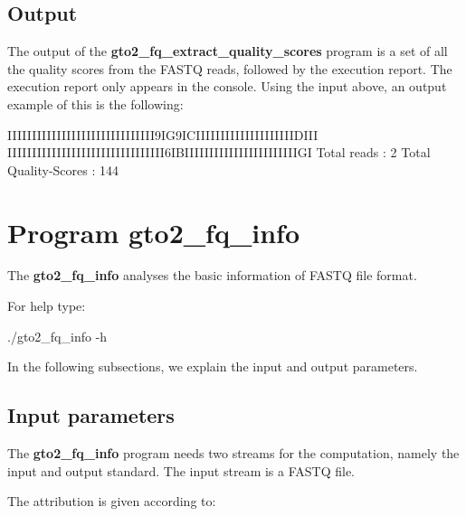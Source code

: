\documentclass[11pt,]{krantz}
\newenvironment{Shaded}{\begin{snugshade}}{\end{snugshade}}
\newcommand{\ExtensionTok}[1]{#1}
\newcommand{\NormalTok}[1]{#1}
\begin{document}
\subsection*{Output}\label{output-3}


The output of the \textbf{gto2\_fq\_extract\_quality\_scores} program is
a set of all the quality scores from the FASTQ reads, followed by the
execution report. The execution report only appears in the console.
Using the input above, an output example of this is the following:

\begin{Shaded}
\begin{Highlighting}[]
\ExtensionTok{IIIIIIIIIIIIIIIIIIIIIIIIIIIIII9IG9ICIIIIIIIIIIIIIIIIIIIIDIII}
\ExtensionTok{IIIIIIIIIIIIIIIIIIIIIIIIIIIIIIII6IBIIIIIIIIIIIIIIIIIIIIIIIGI}
\ExtensionTok{Total}\NormalTok{ reads          : 2}
\ExtensionTok{Total}\NormalTok{ Quality-Scores : 144}
\end{Highlighting}
\end{Shaded}

\section{Program gto2\_fq\_info}\label{program-gto2_fq_info}

The \textbf{gto2\_fq\_info} analyses the basic information of FASTQ file
format.

For help type:

\begin{Shaded}
\begin{Highlighting}[]
\ExtensionTok{./gto2_fq_info}\NormalTok{ -h}
\end{Highlighting}
\end{Shaded}

In the following subsections, we explain the input and output
parameters.

\subsection*{Input parameters}\label{input-parameters-4}


The \textbf{gto2\_fq\_info} program needs two streams for the
computation, namely the input and output standard. The input stream is a
FASTQ file.

The attribution is given according to:
\end{document}
